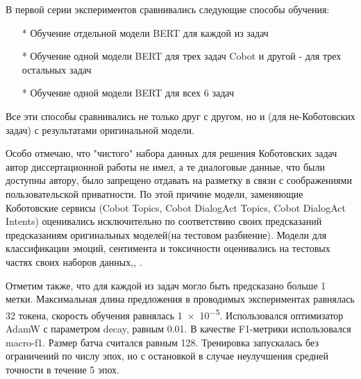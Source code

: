 В первой серии экспериментов сравнивались следующие способы обучения:
\begin{itemize}
\item[*] Обучение отдельной модели BERT для каждой из задач
\item[*] Обучение одной модели BERT для трех задач Cobot и другой - для трех остальных задач
\item[*] Обучение одной модели BERT для всех 6 задач
\end{itemize}

Все эти способы сравнивались не только друг с другом, но и (для не-Коботовских задач) с результатами оригинальной модели. 

Особо отмечаю, что "чистого" набора данных для решения Коботовских задач автор диссертационной работы не имел, а те диалоговые данные, что были доступны автору, было запрещено отдавать на разметку в связи с соображениями пользовательской приватности. По этой причине модели, заменяющие Коботовские сервисы (Cobot Topics, Cobot DialogAct Topics, Cobot DialogAct Intents) оценивались исключительно по соответствию своих предсказаний предсказаниям оригинальных моделей(на тестовом разбиение). Модели для классификации эмоций, сентимента и токсичности оценивались на тестовых частях своих наборов данных\cite{socher_2013},\cite{na_website_ndo_emo},\cite{na_website_ndm_toxic} . 


Отметим также, что для каждой из задач могло быть предсказано больше 1 метки.
Максимальная длина предложения в проводимых экспериментах равнялась 32 токена, скорость обучения равнялась \num{1e-5}. Использовался оптимизатор AdamW с параметром decay, равным 0.01. В качестве F1-метрики использовался macro-f1. Размер батча считался равным 128. Тренировка запускалась без ограничений по числу эпох, но с остановкой в случае неулучшения средней точности в течение 5 эпох.



